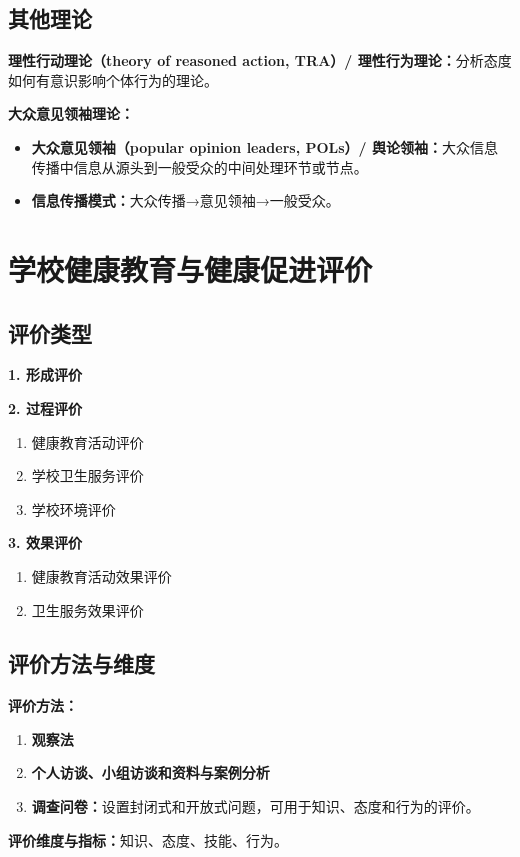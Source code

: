 \subsection{其他理论}

\begin{tipbox}
\textbf{理性行动理论（theory of reasoned action, TRA）/ 理性行为理论：}分析态度如何有意识影响个体行为的理论。

\textbf{大众意见领袖理论：}
\begin{itemize}
    \item \textbf{大众意见领袖（popular opinion leaders, POLs）/ 舆论领袖：}大众信息传播中信息从源头到一般受众的中间处理环节或节点。
    \item \textbf{信息传播模式：}大众传播→意见领袖→一般受众。
\end{itemize}
\end{tipbox}

\section{学校健康教育与健康促进评价}

\subsection{评价类型}

\begin{keybox}
\textbf{1. 形成评价}

\textbf{2. 过程评价}
\begin{enumerate}[leftmargin=*]
    \item 健康教育活动评价
    \item 学校卫生服务评价
    \item 学校环境评价
\end{enumerate}

\textbf{3. 效果评价}
\begin{enumerate}[leftmargin=*]
    \item 健康教育活动效果评价
    \item 卫生服务效果评价
\end{enumerate}
\end{keybox}

\subsection{评价方法与维度}

\begin{keybox}
\textbf{评价方法：}

\begin{enumerate}[leftmargin=*]
    \item \textbf{观察法}
    \item \textbf{个人访谈、小组访谈和资料与案例分析}
    \item \textbf{调查问卷：}设置封闭式和开放式问题，可用于知识、态度和行为的评价。
\end{enumerate}

\textbf{评价维度与指标：}知识、态度、技能、行为。
\end{keybox}

